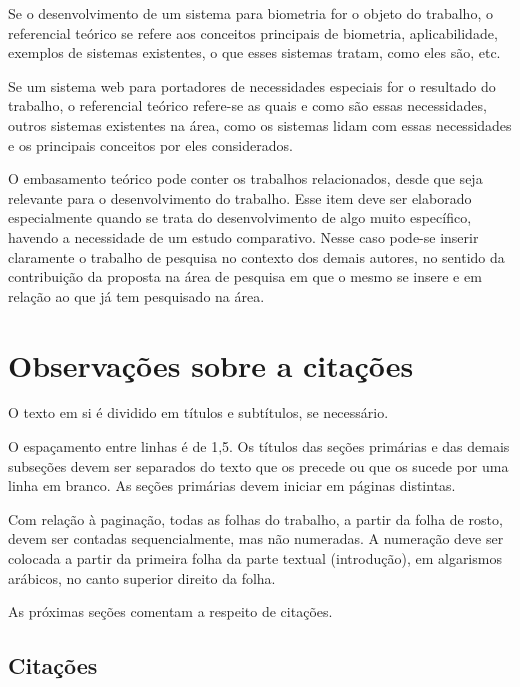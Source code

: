Se o desenvolvimento de um sistema para biometria for o objeto do trabalho, o referencial teórico se refere aos conceitos principais de biometria, aplicabilidade, exemplos de sistemas existentes, o que esses sistemas tratam, como eles são, etc.

Se um sistema web para portadores de necessidades especiais for o resultado do trabalho, o referencial teórico refere-se as quais e como são essas necessidades, outros sistemas existentes na área, como os sistemas lidam com essas necessidades e os principais conceitos por eles considerados.

O embasamento teórico pode conter os trabalhos relacionados, desde que seja relevante para o desenvolvimento do trabalho. Esse item deve ser elaborado especialmente quando se trata do desenvolvimento de algo muito específico, havendo a necessidade de um estudo comparativo. Nesse caso pode-se inserir claramente o trabalho de pesquisa no contexto dos demais autores, no sentido da contribuição da proposta na área de pesquisa em que o mesmo se insere e em relação ao que já tem pesquisado na área.


\section{Observações sobre a citações}\label{sec:formatacaoTexto}

O texto em si é dividido em títulos e subtítulos, se necessário.

O espaçamento entre linhas é de 1,5. Os títulos das seções primárias e das demais subseções devem ser separados do texto que os precede ou que os sucede por uma linha em branco. As seções primárias devem iniciar em páginas distintas.

Com relação à paginação, todas as folhas do trabalho, a partir da folha de rosto, devem ser contadas sequencialmente, mas não numeradas. A numeração deve ser colocada a partir da primeira folha da parte textual (introdução), em algarismos arábicos, no canto superior direito da folha.


As próximas seções comentam a respeito de citações.

\subsection{Citações}\label{subsec:citacoes}

